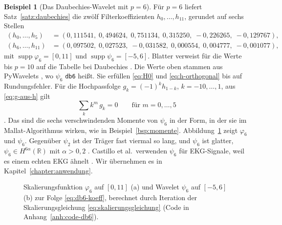 \documentclass[a4paper,11pt,bibliography=totoc,listof=totoc,headinclude=true,cleardoublepage=empty,oneside]{scrbook}
\theoremstyle{plain}
\theoremstyle{definition}
\newtheorem{Beispiel}[Satz]{Beispiel}
\newcommand{\R}{\mathbb{R}}
\DeclareMathOperator{\supp}{supp}
\begin{document}
\begin{Beispiel}[Das Daubechies-Wavelet mit $p = 6$]
\label{bsp:db6}
Für $p = 6$ liefert Satz~\ref{satz:daubechies} die zwölf Filterkoeffizienten
$h_0,\dots,h_{11}$, gerundet auf sechs Stellen
\begin{equation}
\label{eq:db6-koeff}
\begin{aligned}
  (h_0, \dots, h_5) &= (0{,}111541,\; 0{,}494624,\; 0{,}751134,\;
                        0{,}315250,\; -0{,}226265,\; -0{,}129767),\\
  (h_6, \dots, h_{11}) &= (0{,}097502,\; 0{,}027523,\; -0{,}031582,\;
                        0{,}000554,\; 0{,}004777,\; -0{,}001077),
\end{aligned}
\end{equation}
mit $\supp\varphi_6 = [0, 11]$ und $\supp\psi_6 = [-5, 6]$. Blatter verweist
für die Werte bis $p = 10$ auf die Tabelle bei Daubechies
\cite[Kap.~6.2]{blatter}. %
Die Werte oben stammen aus PyWavelets \cite{pywavelets}, wo $\psi_6$
\texttt{db6} hei\ss t. Sie erfüllen \eqref{eq:H0} und \eqref{eq:h-orthogonal}
bis auf Rundungsfehler. Für die Hochpassfolge $g_k = (-1)^k h_{1-k}$,
$k = -10,\dots,1$, aus \eqref{eq:g-aus-h} gilt
\[
  \sum_k k^m\,g_k = 0 \qquad\text{für } m = 0,\dots,5
\]
\cite[Lemma~2.4.27]{lmr}. %
Das sind die sechs verschwindenden Momente von $\psi_6$ in der Form, in der sie
im Mallat-Algorithmus wirken, wie in Beispiel~\ref{bsp:momente}.
Abbildung~\ref{fig:db6} zeigt $\varphi_6$ und $\psi_6$. Gegenüber $\psi_2$ ist
der Träger fast viermal so lang, und $\psi_6$ ist glatter,
$\psi_6 \in H^{6\alpha}(\R)$ mit $\alpha > 0{,}2$ \cite[Kap.~2.4.4]{lmr}. %
Castillo et al.\ verwenden $\psi_6$ für EKG-Signale, weil es einem echten EKG
ähnelt \cite[Abschn.~3.1.1]{castillo}. %
Wir übernehmen es in Kapitel~\ref{chapter:anwendung}.
\end{Beispiel}

\begin{figure}[htbp]
  \centering
  \hfill
  \caption[Das Daubechies-Wavelet mit zwölf Koeffizienten]{Skalierungsfunktion
  $\varphi_6$ auf $[0,11]$ (a) und Wavelet $\psi_6$ auf $[-5,6]$ (b) zur Folge
  \eqref{eq:db6-koeff}, berechnet durch Iteration der Skalierungsgleichung
  \eqref{eq:skalierungsgleichung} (Code in Anhang~\ref{anh:code-db6}).}
  \label{fig:db6}
\end{figure}
\end{document}
